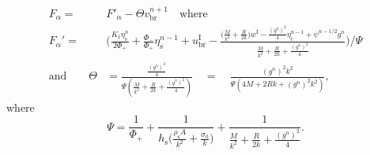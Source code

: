 \documentclass{article}
\begin{document}
\begin{align}
    F_\alpha = &F'_\alpha - \Theta v^{n+1}_\text{br} \quad \text{where}\\
    F_\alpha' =& \Bigg(\frac{K_1\eta^n_\text{s}}{2\Phi_+}+\frac{\Phi_-}{\Phi_+}\eta_\text{s}^{n-1}+u^\text{I}_\text{br}-\frac{\Big(\frac{M}{k^2}+\frac{R}{2k}\Big)w^\text{I}-\frac{(g^n)^2}{4}\eta_\text{c}^{n-1}+\psi^{n-1/2}g^n}{\frac{M}{k^2}+\frac{R}{2k}+\frac{(g^n)^2}{4}}\Bigg)/\Psi\\
    \text{and} \quad \quad \Theta &= \frac{\frac{(g^n)^2}{4}}{\Psi(\frac{M}{k^2} + \frac{R}{2k} + \frac{(g^n)^2}{4})}\quad =\quad \frac{(g^n)^2 k^2}{\Psi (4M+2Rk+(g^n)^2k^2)},
\end{align}
where 
\begin{equation}
    \Psi = \frac{1}{\Phi_+} +  \frac{1}{h_\text{s}\Big(\frac{\rho_\text{s}A}{k^2} + \frac{\sigma_0}{k}\Big)}+\frac{1}{\frac{M}{k^2}+\frac{R}{2k} + \frac{(g^n)^2}{4}}.
\end{equation}
\end{document}

